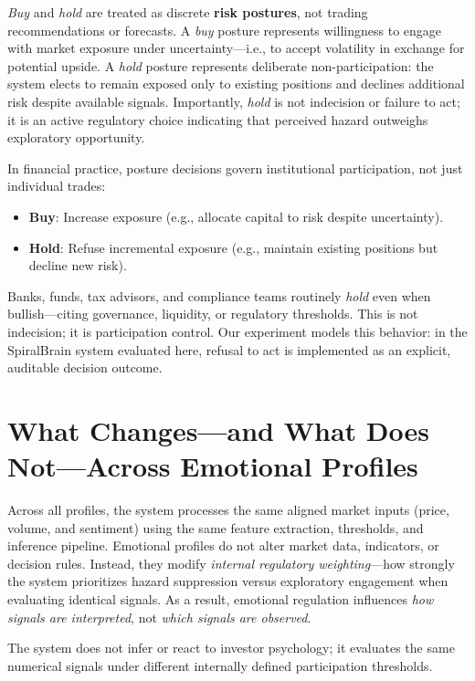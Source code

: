 \documentclass[12pt,a4paper]{article}
\begin{document}
\emph{Buy} and \emph{hold} are treated as discrete \textbf{risk postures}, not trading recommendations or forecasts. A \emph{buy} posture represents willingness to engage with market exposure under uncertainty—i.e., to accept volatility in exchange for potential upside. A \emph{hold} posture represents deliberate non-participation: the system elects to remain exposed only to existing positions and declines additional risk despite available signals. Importantly, \emph{hold} is not indecision or failure to act; it is an active regulatory choice indicating that perceived hazard outweighs exploratory opportunity.

In financial practice, posture decisions govern institutional participation, not just individual trades:

\begin{itemize}
	\item \textbf{Buy}: Increase exposure (e.g., allocate capital to risk despite uncertainty).
	\item \textbf{Hold}: Refuse incremental exposure (e.g., maintain existing positions but decline new risk).
\end{itemize}

Banks, funds, tax advisors, and compliance teams routinely \emph{hold} even when bullish—citing governance, liquidity, or regulatory thresholds. This is not indecision; it is participation control. Our experiment models this behavior: in the SpiralBrain system evaluated here, refusal to act is implemented as an explicit, auditable decision outcome.

\section{What Changes—and What Does Not—Across Emotional Profiles}

Across all profiles, the system processes the same aligned market inputs (price, volume, and sentiment) using the same feature extraction, thresholds, and inference pipeline. Emotional profiles do not alter market data, indicators, or decision rules. Instead, they modify \emph{internal regulatory weighting}—how strongly the system prioritizes hazard suppression versus exploratory engagement when evaluating identical signals. As a result, emotional regulation influences \emph{how signals are interpreted}, not \emph{which signals are observed}.

The system does not infer or react to investor psychology; it evaluates the same numerical signals under different internally defined participation thresholds.
\end{document}
